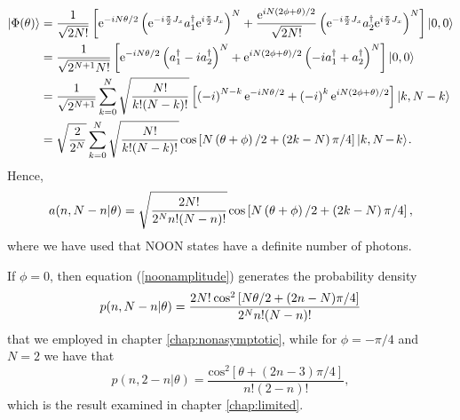 \begin{align}
| \Phi(\theta) \rangle &=  \frac{1}{\sqrt{2 N!}}\left[\mathrm{e}^{-iN\theta/2}\left(\mathrm{e}^{-i\frac{\pi}{2}J_x} a_1^\dagger \mathrm{e}^{i\frac{\pi}{2}J_x}\right)^N + \frac{\mathrm{e}^{iN\left(2\phi + \theta\right)/2}}{\sqrt{2 N!}} \left(\mathrm{e}^{-i\frac{\pi}{2}J_x} a_2^\dagger \mathrm{e}^{i\frac{\pi}{2}J_x}\right)^N \right]\ket{0, 0}
\nonumber \\
&= \frac{1}{\sqrt{2^{N+1} N!}}\left[\mathrm{e}^{-iN\theta/2}\left(a_1^\dagger - i a_2^\dagger\right)^N + \mathrm{e}^{iN\left(2\phi + \theta\right)/2}\left(-i a_1^\dagger + a_2^\dagger\right)^N \right] \ket{0, 0}
\nonumber \\
&= \frac{1}{\sqrt{2^{N+1}}}\sum_{k=0}^N \sqrt{\frac{N!}{k! (N-k)!}}\left[ \left(-i\right)^{N-k}\mathrm{e}^{-iN\theta/2} + \left(-i\right)^k \mathrm{e}^{iN\left(2\phi + \theta\right)/2} \right] \ket{k, N-k}
\nonumber \\
&= \sqrt{\frac{2}{2^N}}\sum_{k=0}^N \sqrt{\frac{N!}{k! (N-k)!}} \hspace{0.1em}\mathrm{cos}\left[N\left(\theta+\phi\right)/2 + \left(2k - N\right)\pi/4 \right] \ket{k, N \hspace{-0.1em} - \hspace{-0.1em} k}\hspace{-0.1em}.\hspace{-0.5em}
\end{align}
Hence, 
\begin{equation}
a(n, N - n | \theta) = \sqrt{\frac{2N!}{2^N n! (N-n)!}} \hspace{0.1em}\mathrm{cos}\left[N\left(\theta+\phi\right)/2 + \left(2k - N\right)\pi/4 \right],
\label{noonamplitude}
\end{equation}
where we have used that NOON states have a definite number of photons. 

If $\phi = 0$, then equation (\ref{noonamplitude}) generates the probability density
\begin{equation}
p(n,N-n|\theta) = \frac{2 N! \hspace{0.2em} \mathrm{cos}^2\left[N\theta/2 + (2n-N)\pi/4\right]}{2^N n! (N-n)!} 
\end{equation}
that we employed in chapter \ref{chap:nonasymptotic}, while for $\phi = -\pi/4$ and $N = 2$ we have that
\begin{equation}
p(n,2-n|\theta) = \frac{\mathrm{cos}^2\left[\theta + (2n-3)\pi/4\right]}{ n! (2-n)!},
\end{equation}
which is the result examined in chapter \ref{chap:limited}.

